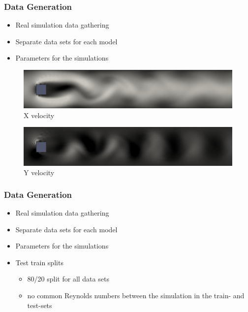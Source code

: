 \documentclass[18pt]{beamer}
\begin{document}
\begin{frame}[t]
  \frametitle{Data Generation}
  \begin{itemize}
  \item Real simulation data gathering
  \item Separate data sets for each model
  \item Parameters for the simulations
  \end{itemize}
  \begin{center}
    \begin{figure}[htb]
      \includegraphics[scale=0.2]{images/flows/flow_x}
      \caption{X velocity}
      \vspace{-0.2cm}
    \end{figure}
    
    \begin{figure}[htb]
      \includegraphics[scale=0.2]{images/flows/flow_y}
      \vspace{-0.2cm}
      \caption{Y velocity}
    \end{figure}
  \end{center}
\end{frame}

\begin{frame}[t]
  \frametitle{Data Generation}

  \begin{itemize}
  \item Real simulation data gathering
  \item Separate data sets for each model
  \item Parameters for the simulations
  \item Test train splits
    \begin{itemize}
    \item 80\slash 20 split for all data sets
    \item no common Reynolds numbers between the simulation in the train- and test-sets
    \end{itemize}
  \end{itemize}
\end{frame}
\end{document}

